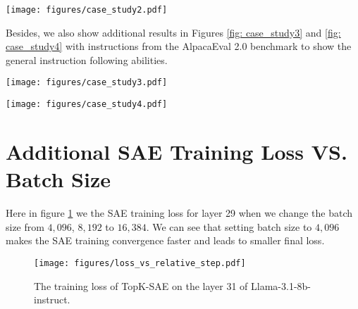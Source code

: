 \begin{figure*}[h]
\centering
\texttt{[image: figures/case\_study2.pdf]}
\caption{Case study to illustrate the
instruction-following performance of Llama-2-13B model finetuned
on $3$k data selected from Alpaca with our \one method, \textit{\#INSTAG} (Baseline1) and Longest-response (Baseline2).}\label{fig: case_study2}
\end{figure*} 

Besides, we also show additional results in Figures \ref{fig: case_study3} and \ref{fig: case_study4} with instructions from the AlpacaEval 2.0 benchmark to show the general instruction following abilities. 

\begin{figure*}[h]
\centering
\texttt{[image: figures/case\_study3.pdf]}
\caption{Case study to illustrate the instruction-following performance of Llama-2-13B model fine-tuned on $5$k data selected from WizardLM\_evol\_instruct-70k with our \one method, and \textit{Repr Filter} (Baseline), with GPT4o-as-the-Judge.}\label{fig: case_study3}
\end{figure*} 


\begin{figure*}[h]
\centering
\texttt{[image: figures/case\_study4.pdf]}
\caption{Case study to illustrate the instruction-following performance of Llama-2-13B model fine-tuned on $5$k data selected from WizardLM\_evol\_instruct-70k with our \one method, and \textit{Repr Filter} (Baseline), with GPT4o-as-the-Judge.}\label{fig: case_study4}
\end{figure*} 




\section{Additional SAE Training Loss VS. Batch Size}\label{app: sae-bs}
Here in figure \ref{fig: loss_bs} we the SAE training loss for layer 29 when we change the batch size from $4,096$, $8,192$ to $16,384$. We can see that setting batch size to $4,096$ makes the SAE training convergence faster and leads to smaller final loss.

\begin{figure}[h]
\centering
\texttt{[image: figures/loss\_vs\_relative\_step.pdf]}
\caption{The training loss of TopK-SAE on the layer 31 of Llama-3.1-8b-instruct.}\label{fig: loss_bs}
\end{figure} 

